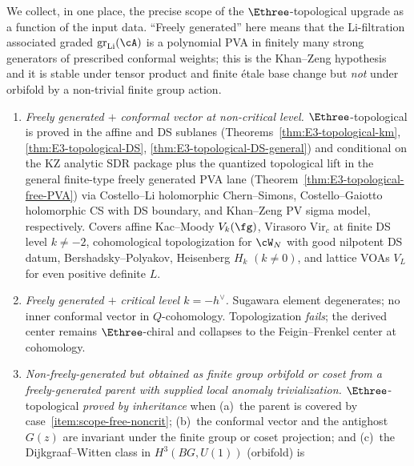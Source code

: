 \begin{remark}
\label{rem:e3-topological-scope-map}
We collect, in one place, the precise scope of the
$\Ethree$-topological upgrade as a function of the input data.
``Freely generated'' here means that the Li-filtration associated
graded $\operatorname{gr}_{\mathrm{Li}}(\cA)$ is a polynomial PVA in
finitely many strong generators of prescribed conformal weights;
this is the Khan--Zeng hypothesis~\cite[\S 3]{KZ25} and it is
stable under tensor product and finite \'etale base change but
\emph{not} under orbifold by a non-trivial finite group action.
\begin{enumerate}[label=\textup{(\arabic*)}]
\item\label{item:scope-free-noncrit}
 \emph{Freely generated $+$ conformal vector at non-critical level.}
 $\Ethree$-topological is proved in the affine and DS sublanes
 \textup{(}Theorems~\ref{thm:E3-topological-km},
 \ref{thm:E3-topological-DS},
 \ref{thm:E3-topological-DS-general}\textup{)} and conditional on the
 KZ analytic SDR package plus the quantized topological lift in the
 general finite-type freely generated PVA lane
 \textup{(}Theorem~\ref{thm:E3-topological-free-PVA}\textup{)} via Costello--Li
 holomorphic Chern--Simons, Costello--Gaiotto holomorphic CS with
 DS boundary, and Khan--Zeng PV sigma model, respectively.
 Covers affine Kac--Moody $V_k(\fg)$, Virasoro $\mathrm{Vir}_c$ at
 finite DS level $k\ne -2$, cohomological topologization for
 $\cW_N$ with good nilpotent DS datum, Bershadsky--Polyakov,
 Heisenberg $H_k$ $(k \neq 0)$, and lattice VOAs $V_L$ for even positive
 definite $L$.
\item\label{item:scope-free-crit}
 \emph{Freely generated $+$ critical level
 $k = -h^{\vee}$.}
 Sugawara element degenerates; no inner conformal vector
 in $Q$-cohomology. Topologization \emph{fails}; the derived
 center remains $\Ethree$-chiral and collapses to the
 Feigin--Frenkel center at cohomology.
\item\label{item:scope-orbifold}
 \emph{Non-freely-generated but obtained as finite group orbifold or
 coset from a freely-generated parent with supplied local anomaly
 trivialization.} $\Ethree$-topological \emph{proved by inheritance}
 when (a)~the parent is covered by case~\ref{item:scope-free-noncrit};
 (b)~the conformal vector and the antighost~$G(z)$ are invariant
 under the finite group or coset projection; and (c)~the
 Dijkgraaf--Witten class in $H^3(BG, U(1))$ (orbifold) is

\end{enumerate}
\end{remark}
